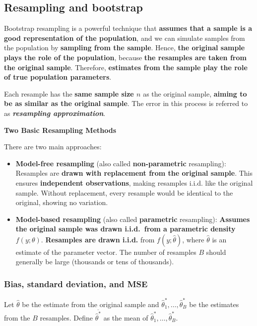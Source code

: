 \documentclass[12pt,a4paper]{article}
\begin{document}
\subsection{Resampling and bootstrap}

Bootstrap resampling is a powerful technique that \textbf{assumes that a sample is a good representation of the population}, and we can simulate samples from the population by \textbf{sampling from the sample}. Hence, \textbf{the original sample plays the role of the population}, because \textbf{the resamples are taken from the original sample}. Therefore, \textbf{estimates from the sample play the role of true population parameters}.

\vspace{0.5em}

Each resample has the \textbf{same sample size $n$} as the original sample, \textbf{aiming to be as similar as the original sample}. The error in this process is referred to as \textit{\textbf{resampling approximation}}.

\vspace{0.5em}

\textbf{Two Basic Resampling Methods}

There are two main approaches:

\begin{itemize}
    \item \textbf{Model-free resampling} (also called \textbf{non-parametric} resampling): Resamples are \textbf{drawn with replacement from the original sample}. This ensures \textbf{independent observations}, making resamples i.i.d. like the original sample. Without replacement, every resample would be identical to the original, showing no variation.
    \item \textbf{Model-based resampling} (also called \textbf{parametric} resampling): \textbf{Assumes the original sample was drawn i.i.d.\ from a parametric density} $f(y; \theta)$. \textbf{Resamples are drawn i.i.d.} from $f(y; \hat{\theta})$, where $\hat{\theta}$ is an estimate of the parameter vector. The number of resamples $B$ should generally be large (thousands or tens of thousands).
\end{itemize}

\subsubsection{Bias, standard deviation, and MSE}

Let $\hat{\theta}$ be the estimate from the original sample and $\hat{\theta}_1^*, \ldots, \hat{\theta}_B^*$ be the estimates from the $B$ resamples. Define $\overline{\hat{\theta}^*}$ as the mean of $\hat{\theta}_1^*, \ldots, \hat{\theta}_B^*$.
\end{document}
